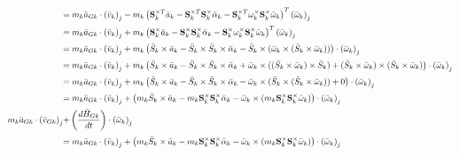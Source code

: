 \documentclass[a4paper,10pt]{article}
\newcommand\scalemath[2]{\scalebox{#1}{\mbox{\ensuremath{\displaystyle #2}}}}
\begin{document}
\begin{align}
 &\scalemath{0.775}{=  m_k \bar{a}_{Gk} \cdot \left(\bar{v}_k\right)_j - m_k \left( \mathbf{S}^{\times T}_k \bar{a}_k -  \mathbf{S}^{\times T}_k \mathbf{S}^{\times}_k \bar{\alpha}_k - \mathbf{S}^{\times T}_k \mathbf{\omega}^{\times}_k \mathbf{S}^{\times}_k \bar{\omega}_k \right)^T  \left(\bar{\omega}_k\right)_j} \nonumber \\
 &\scalemath{0.775}{=  m_k \bar{a}_{Gk} \cdot \left(\bar{v}_k\right)_j + m_k \left( \mathbf{S}^{\times}_k \bar{a}_k -  \mathbf{S}^{\times}_k \mathbf{S}^{\times}_k \bar{\alpha}_k - \mathbf{S}^{\times}_k \mathbf{\omega}^{\times}_k \mathbf{S}^{\times}_k \bar{\omega}_k \right)^T  \left(\bar{\omega}_k\right)_j} \nonumber \\
 &\scalemath{0.775}{=  m_k \bar{a}_{Gk} \cdot \left(\bar{v}_k\right)_j + m_k \left( \bar{S}_k \times \bar{a}_k -  \bar{S}_k \times \bar{S}_k \times \bar{\alpha}_k - \bar{S}_k \times ( \bar{\omega}_k \times ( \bar{S}_k \times \bar{\omega}_k ) ) \right) \cdot  \left(\bar{\omega}_k\right)_j} \nonumber \\
 &\scalemath{0.775}{=  m_k \bar{a}_{Gk} \cdot \left(\bar{v}_k\right)_j + m_k \left( \bar{S}_k \times \bar{a}_k -  \bar{S}_k \times \bar{S}_k \times \bar{\alpha}_k + \bar{\omega}_k \times ( ( \bar{S}_k \times \bar{\omega}_k ) \times  \bar{S}_k ) + ( \bar{S}_k \times \bar{\omega}_k ) \times ( \bar{S}_k \times \bar{\omega}_k )  \right) \cdot  \left(\bar{\omega}_k\right)_j} \nonumber \\
 &\scalemath{0.775}{=  m_k \bar{a}_{Gk} \cdot \left(\bar{v}_k\right)_j + m_k \left( \bar{S}_k \times \bar{a}_k -  \bar{S}_k \times \bar{S}_k \times \bar{\alpha}_k - \bar{\omega}_k \times ( \bar{S}_k \times ( \bar{S}_k \times \bar{\omega}_k ) ) + 0  \right) \cdot  \left(\bar{\omega}_k\right)_j} \nonumber \\
 &\scalemath{0.775}{=  m_k \bar{a}_{Gk} \cdot \left(\bar{v}_k\right)_j + \left( m_k \bar{S}_k \times \bar{a}_k -  m_k \mathbf{S}^{\times}_k \mathbf{S}^{\times}_k \bar{\alpha}_k - \bar{\omega}_k \times (m_k \mathbf{S}^{\times}_k \mathbf{S}^{\times}_k \bar{\omega}_k) \right) \cdot  \left(\bar{\omega}_k\right)_j} \\
 \scalemath{0.775}{m_k \bar{a}_{Gk} \cdot \left(\bar{v}_{Gk}\right)_j} &\scalemath{0.775}{ + \left( \frac{d\bar{H}_{Gk}}{dt} \right) \cdot \left( \bar\omega_k \right)_j} \nonumber \\
 &\scalemath{0.775}{=  m_k \bar{a}_{Gk} \cdot \left(\bar{v}_k\right)_j + \left( m_k \bar{S}_k \times \bar{a}_k -  m_k \mathbf{S}^{\times}_k \mathbf{S}^{\times}_k \bar{\alpha}_k - \bar{\omega}_k \times (m_k \mathbf{S}^{\times}_k \mathbf{S}^{\times}_k \bar{\omega}_k) \right) \cdot  \left(\bar{\omega}_k\right)_j} \nonumber \\

\end{align}
\end{document}
